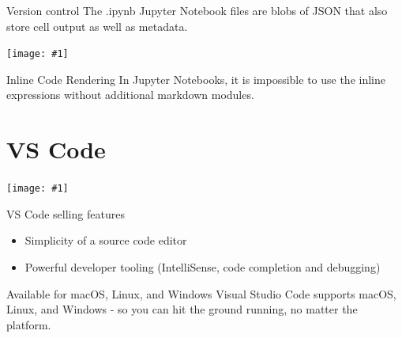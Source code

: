 \documentclass[
  11pt,
  ignorenonframetext,
  aspectratio=169]{beamer}
\providecommand{\tightlist}{%
  \setlength{\itemsep}{0pt}\setlength{\parskip}{0pt}}
\newcommand{\fullframegraphic}[1]{
  \texttt{[image: \#1]}
}
\newlength\beamerleftmargin
\begin{document}
\begin{frame}{Version control}
\protect\hypertarget{version-control}{}
The .ipynb Jupyter Notebook files are blobs of JSON that also store cell
output as well as metadata.
\end{frame}

\begin{frame}{}
\protect\hypertarget{section-7}{}
\vspace*{-10.6mm}\hspace*{-\beamerleftmargin}\hspace*{-1.5mm}
\fullframegraphic{"../captures/Capture d’écran (14)"}
\end{frame}

\begin{frame}{Inline Code Rendering}
\protect\hypertarget{inline-code-rendering}{}
In Jupyter Notebooks, it is impossible to use the inline expressions
without additional markdown modules.
\end{frame}

\hypertarget{vs-code}{%
\section{VS Code}\label{vs-code}}

\begin{frame}{}
\protect\hypertarget{section-8}{}
\vspace*{-10.6mm}\hspace*{-\beamerleftmargin}\hspace*{-1.5mm}
\fullframegraphic{"../captures/Capture d’écran (4)"}
\end{frame}

\begin{frame}{VS Code selling features}
\protect\hypertarget{vs-code-selling-features}{}
\begin{itemize}
\tightlist
\item
  Simplicity of a source code editor
\item
  Powerful developer tooling (IntelliSense, code completion and
  debugging)
\end{itemize}
\end{frame}

\begin{frame}{Available for macOS, Linux, and Windows}
\protect\hypertarget{available-for-macos-linux-and-windows}{}
Visual Studio Code supports macOS, Linux, and Windows - so you can hit
the ground running, no matter the platform.
\end{frame}
\end{document}
